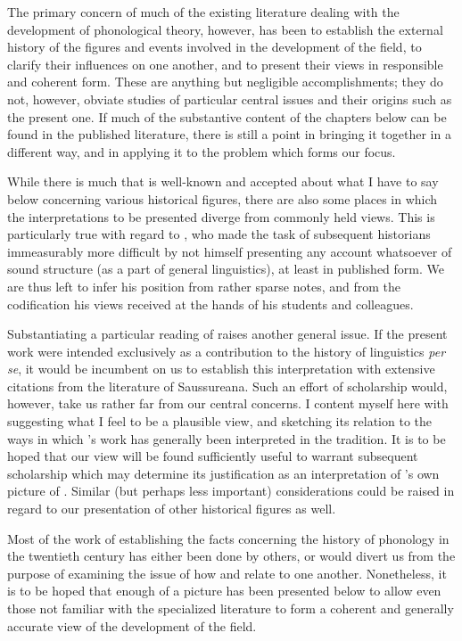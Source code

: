 The primary concern of much of the existing literature dealing with
the development of phonological theory, however, has been to establish
the external history of the figures and events involved in the
development of the field, to clarify their influences on one another,
and to present their views in responsible and coherent form. These are
anything but negligible accomplishments; they do not, however, obviate
studies of particular central issues and their origins such as the
present one. If much of the substantive content of the chapters below
can be found in the published literature, there is still a point in
bringing it together in a different way, and in applying it to the
problem which forms our focus.

While there is much that is well-known and accepted about what I have
to say below concerning various historical figures, there are also
some places in which the interpretations to be presented diverge from
commonly held views.  This is particularly true with regard to
{\Saussure}, who made the task of subsequent historians immeasurably more
difficult by not himself presenting any account whatsoever of sound
structure (as a part of general linguistics), at least in published
form.  We are thus left to infer his position from rather sparse
notes, and from the codification his views received at the hands of
his students and colleagues.

Substantiating a particular reading of {\Saussure} raises another general
issue. If the present work were intended exclusively as a contribution
to the history of linguistics \emph{per se}, it would be incumbent
on us to establish this interpretation with extensive citations from
the literature of Saussureana.  Such an effort of scholarship would,
however, take us rather far from our central concerns.  I content
myself here with suggesting what I feel to be a plausible view,
and sketching its relation to the ways in which {\Saussure}'s work has
generally been interpreted in the tradition.  It is to be hoped that
our view will be found sufficiently useful to warrant subsequent
scholarship which may determine its justification as an interpretation
of {\Saussure}'s own picture of .  Similar (but perhaps
less important) considerations could be raised in regard to our
presentation of other historical figures as well.

Most of the work of establishing the facts concerning the history of
phonology in the twentieth century has either been done by others, or
would divert us from the purpose of examining the issue of how 
and  relate to one another.  Nonetheless, it is to be
hoped that enough of a picture has been presented below to allow even
those not familiar with the specialized literature to form a coherent
and generally accurate view of the development of the field.


